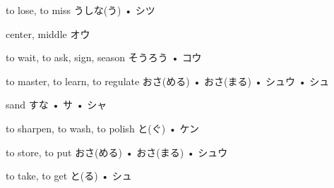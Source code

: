 



\setcounter{cardnum}{41}

		{to lose, to miss}
		{うしな(う) • シツ}
		{}{}
		{}{}
		{}{}
		{}{}
		{}{}

		{center, middle}
		{オウ}
		{}{}
		{}{}
		{}{}
		{}{}
		{}{}

		{to wait, to ask, sign, season}
		{そうろう • コウ}
		{}{}
		{}{}
		{}{}
		{}{}
		{}{}

		{to master, to learn, to regulate}
		{おさ(める) • おさ(まる) • シュウ • シュ}
		{}{}
		{}{}
		{}{}
		{}{}
		{}{}

		{sand}
		{すな • サ • シャ}
		{}{}
		{}{}
		{}{}
		{}{}
		{}{}

		{to sharpen, to wash, to polish}
		{と(ぐ) • ケン}
		{}{}
		{}{}
		{}{}
		{}{}
		{}{}

		{to store, to put}
		{おさ(める) • おさ(まる) • シュウ}
		{}{}
		{}{}
		{}{}
		{}{}
		{}{}

		{to take, to get}
		{と(る) • シュ}
		{}{}
		{}{}
		{}{}
		{}{}
		{}{}

